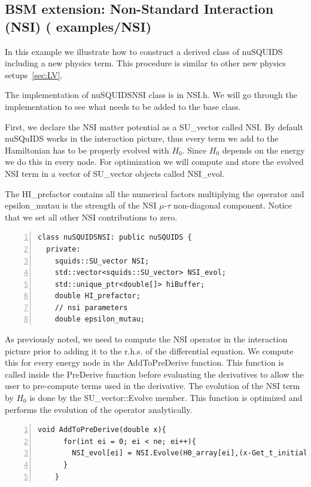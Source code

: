 \documentclass[3p,12pt]{elsarticle}
\newcommand{\ttf}{\ttfamily}
\begin{document}
\subsection{BSM extension: Non-Standard  Interaction (NSI) \textnormal{({\ttf
      examples/NSI})}}
\label{sec:NSI}
In this example we illustrate how to construct a derived class of
{\ttf nuSQUIDS} including a new physics term. This procedure is similar to
other new physics setups~\ref{sec:LV}.

The implementation of {\ttf nuSQUIDSNSI} class is in {\ttf NSI.h}.
We will go through the implementation to see what needs to be
added to the base class.

First, we declare the NSI matter potential as a {\ttf SU\_vector}
called {\ttf NSI}. By default {\ttf nuSQuIDS}  works in the interaction
picture, thus every term we add to the Hamiltonian has to be properly
evolved with $H_0$. Since $H_0$ depends on the energy we do this in
every node. For optimization we will compute and store the evolved NSI
term in a vector of {\ttf SU\_vector} objects called {\ttf NSI\_evol}.

The {\ttf HI\_prefactor} contains all the numerical factors multiplying the
operator and {\ttf epsilon\_mutau} is the strength of the NSI $\mu$-$\tau$ 
non-diagonal component. Notice that we set all other NSI
contributions to zero.

\begin{lstlisting}[frame=leftline, numbers =
  left,breaklines=true,label = ex:sin1]
class nuSQUIDSNSI: public nuSQUIDS {
  private:
    squids::SU_vector NSI;
    std::vector<squids::SU_vector> NSI_evol;
    std::unique_ptr<double[]> hiBuffer;
    double HI_prefactor;
    // nsi parameters
    double epsilon_mutau;

\end{lstlisting}

As previously noted, we need to compute the NSI operator in the
interaction picture prior to adding it to the r.h.s. of the
differential equation. We compute this for every energy node in the
{\ttf AddToPreDerive} function. This function is called inside the
{\ttf PreDerive} function before evaluating the derivatives to allow
the user to pre-compute terms used in the derivative.
The evolution of the NSI term by $H_0$ is done by the {\ttf
  SU\_vector::Evolve} member. This function is optimized and performs
the evolution of the operator analytically.

\begin{lstlisting}[frame=leftline, numbers =
  left,breaklines=true,label = ex:sin1,firstnumber=last]
    void AddToPreDerive(double x){
      for(int ei = 0; ei < ne; ei++){
        NSI_evol[ei] = NSI.Evolve(H0_array[ei],(x-Get_t_initial()));
      }
    }
\end{lstlisting}
\end{document}
